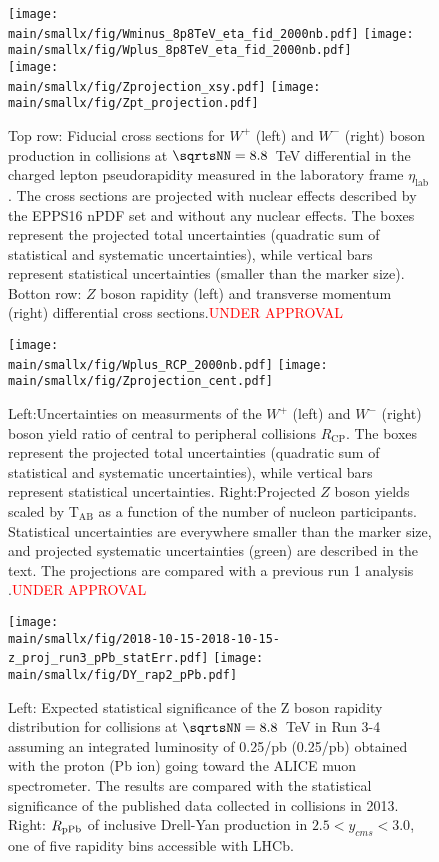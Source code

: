 \documentclass[../report.tex]{subfiles}
\providecommand{\main}{..}
\begin{document}
\begin{figure}
\centering
\texttt{[image: \\main/smallx/fig/Wminus\_8p8TeV\_eta\_fid\_2000nb.pdf]}
\texttt{[image: \\main/smallx/fig/Wplus\_8p8TeV\_eta\_fid\_2000nb.pdf]}\\
\texttt{[image: \\main/smallx/fig/Zprojection\_xsy.pdf]}
\texttt{[image: \\main/smallx/fig/Zpt\_projection.pdf]}
\caption{Top row: Fiducial cross sections for $W^+$ (left) and $W^-$ (right) boson production in \pPb collisions at $\sqrtsNN=8.8$~TeV differential in the charged lepton pseudorapidity measured in the laboratory frame $\eta_{\mathrm{lab}}$. The cross sections are projected with nuclear effects described by the EPPS16 nPDF set and without any nuclear effects. The boxes represent the projected total uncertainties (quadratic sum of statistical and systematic uncertainties), while vertical bars represent statistical uncertainties (smaller than the marker size).
Botton row: $Z$ boson rapidity (left) and transverse momentum (right) differential cross sections.\textcolor{red}{UNDER APPROVAL}}
\label{fig:ATLASWZxsection}
\texttt{[image: \\main/smallx/fig/Wplus\_RCP\_2000nb.pdf]}
\texttt{[image: \\main/smallx/fig/Zprojection\_cent.pdf]}
\caption{Left:Uncertainties on measurments of the $W^+$ (left) and $W^-$ (right) boson yield ratio of central to peripheral collisions $R_{\mathrm{CP}}$.  The boxes represent the projected total uncertainties (quadratic sum of statistical and systematic uncertainties), while vertical bars represent statistical uncertainties.  Right:Projected $Z$ boson yields scaled by T$_{\mathrm{AB}}$ as a function of the number of nucleon participants.  Statistical uncertainties are everywhere smaller than the marker size, and projected systematic uncertainties (green) are described in the text.  The projections are compared with a previous run 1 analysis  \cite{Aad:2015gta}.\textcolor{red}{UNDER APPROVAL}}
\label{fig:ATLASWZcent} 
\end{figure}


\begin{figure}[htb]
\centering
\texttt{[image: \\main/smallx/fig/2018-10-15-2018-10-15-z\_proj\_run3\_pPb\_statErr.pdf]}
\texttt{[image: \\main/smallx/fig/DY\_rap2\_pPb.pdf]}
\caption{Left: Expected statistical significance of the Z boson rapidity distribution for \pPb collisions at $\sqrtsNN = 8.8$~TeV in Run 3-4 assuming an integrated luminosity of 0.25/pb (0.25/pb) obtained with the proton (Pb ion) going toward the ALICE muon spectrometer. %
The results are compared with the statistical significance of the published data collected in \pPb collisions in 2013. Right: $R_{\rm pPb}$ of inclusive Drell-Yan production in $2.5<y_{cms}<3.0$, one of five rapidity bins accessible with LHCb.  %
}
\label{fig:plotDY}
\end{figure}
\end{document}
